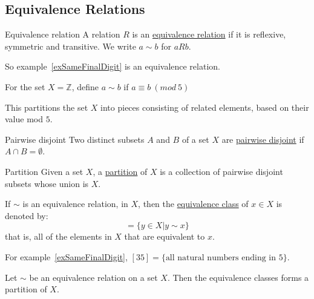 \documentclass[../Main.tex]{subfiles}
\begin{document}
\subsection{Equivalence Relations}
\begin{definition}{Equivalence relation}
    A relation $R$ is an \underline{equivalence relation} if it is reflexive, symmetric and transitive. We write $a \sim b$ for $aRb$.
\end{definition}
So example~\ref{exSameFinalDigit} is an equivalence relation.
\begin{example}
    For the set $X = \mathbb{Z}$, define $a \sim b$ if $a \equiv b~(mod~5)$\par
    This partitions the set $X$ into pieces consisting of related elements, based on their value mod $5$.\par
\end{example}
\begin{definition}{Pairwise disjoint}
    Two distinct subsets $A$ and $B$ of a set $X$ are \underline{pairwise disjoint} if $A \cap B = \emptyset$.
\end{definition}
\begin{definition}{Partition}
    Given a set $X$, a \underline{partition} of $X$ is a collection of pairwise disjoint subsets whose union is $X$.
\end{definition}
\begin{definition}
    If $\sim$ is an equivalence relation, in $X$, then the \underline{equivalence class} of $x \in X$ is denoted by:
    \begin{equation*}
        [x] = \{y \in X | y \sim x\}
    \end{equation*}
    that is, all of the elements in $X$ that are equivalent to $x$.
\end{definition}
\begin{example}
    For example~\ref{exSameFinalDigit}, $[35] = \{\text{all natural numbers ending in 5}\}$.
\end{example}
\begin{theorem}
    Let $\sim$ be an equivalence relation on a set $X$. Then the equivalence classes forms a partition of $X$.
\end{theorem}
\end{document}
